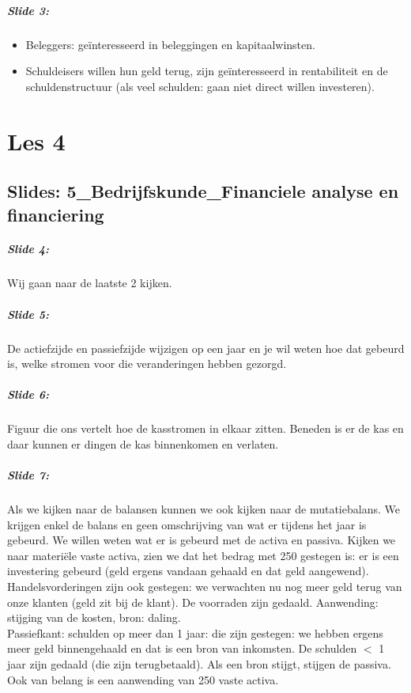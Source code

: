 \documentclass[10pt,a4paper]{report}
\begin{document}
\paragraph{Slide 3: }
\begin{itemize}
\item Beleggers: ge\"interesseerd in beleggingen en kapitaalwinsten.
\item Schuldeisers willen hun geld terug, zijn ge\"interesseerd in rentabiliteit en de schuldenstructuur (als veel schulden: gaan niet direct willen investeren).
\end{itemize}

\chapter{Les 4}

\section{Slides: 5\_Bedrijfskunde\_Financiele analyse en financiering}

\paragraph{Slide 4:} Wij gaan naar de laatste 2 kijken.

\paragraph{Slide 5:} De actiefzijde en passiefzijde wijzigen op een jaar en je wil weten hoe dat gebeurd is, welke stromen voor die veranderingen hebben gezorgd.

\paragraph{Slide 6:} Figuur die ons vertelt hoe de kasstromen in elkaar zitten. Beneden is er de kas en daar kunnen er dingen de kas binnenkomen en verlaten.

\paragraph{Slide 7:} Als we kijken naar de balansen kunnen we ook kijken naar de mutatiebalans. We krijgen enkel de balans en geen omschrijving van wat er tijdens het jaar is gebeurd. We willen weten wat er is gebeurd met de activa en passiva. Kijken we naar materi\"ele vaste activa, zien we dat het bedrag met 250 gestegen is: er is een investering gebeurd (geld ergens vandaan gehaald en dat geld aangewend). Handelsvorderingen zijn ook gestegen: we verwachten nu nog meer geld terug van onze klanten (geld zit bij de klant). De voorraden zijn gedaald. Aanwending: stijging van de kosten, bron: daling.\\
Passiefkant: schulden op meer dan 1 jaar: die zijn gestegen: we hebben ergens meer geld binnengehaald en dat is een bron van inkomsten. De schulden $<$ 1 jaar zijn gedaald (die zijn terugbetaald). Als een bron stijgt, stijgen de passiva.\\
Ook van belang is een aanwending van 250 vaste activa.
\end{document}
